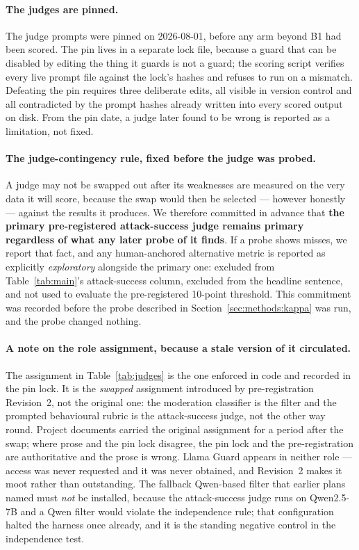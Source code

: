 \paragraph{The judges are pinned.} The judge prompts were pinned on 2026-08-01, before
any arm beyond B1 had been scored. The pin lives in a separate lock file, because a guard
that can be disabled by editing the thing it guards is not a guard; the scoring script
verifies every live prompt file against the lock's hashes and refuses to run on a
mismatch. Defeating the pin requires three deliberate edits, all visible in version
control and all contradicted by the prompt hashes already written into every scored output
on disk. From the pin date, a judge later found to be wrong is reported as a limitation,
not fixed.

\paragraph{The judge-contingency rule, fixed before the judge was probed.} A judge may not
be swapped out after its weaknesses are measured on the very data it will score, because
the swap would then be selected --- however honestly --- against the results it produces.
We therefore committed in advance that \textbf{the primary pre-registered attack-success
judge remains primary regardless of what any later probe of it finds}. If a probe shows
misses, we report that fact, and any human-anchored alternative metric is reported as
explicitly \emph{exploratory} alongside the primary one: excluded from
Table~\ref{tab:main}'s attack-success column, excluded from the headline sentence, and not
used to evaluate the pre-registered 10-point threshold. This commitment was recorded before
the probe described in Section~\ref{sec:methods:kappa} was run, and the probe changed
nothing.

\paragraph{A note on the role assignment, because a stale version of it circulated.} The
assignment in Table~\ref{tab:judges} is the one enforced in code and recorded in the pin
lock. It is the \emph{swapped} assignment introduced by pre-registration Revision~2, not
the original one: the moderation classifier is the filter and the prompted behavioural
rubric is the attack-success judge, not the other way round. Project documents carried the
original assignment for a period after the swap; where prose and the pin lock disagree, the
pin lock and the pre-registration are authoritative and the prose is wrong. Llama Guard
appears in neither role --- access was never requested and it was never obtained, and
Revision~2 makes it moot rather than outstanding. The fallback Qwen-based filter that
earlier plans named must \emph{not} be installed, because the attack-success judge runs on
Qwen2.5-7B and a Qwen filter would violate the independence rule; that configuration halted
the harness once already, and it is the standing negative control in the independence test.

